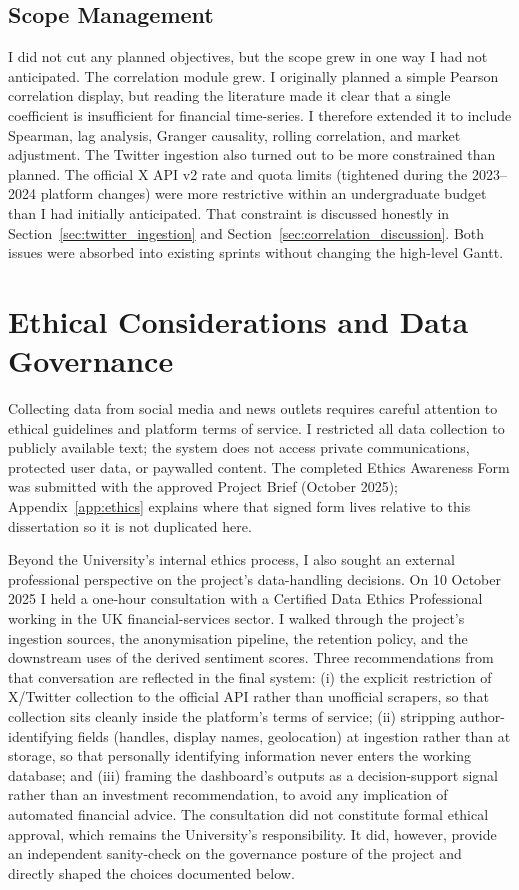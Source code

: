 \subsection{Scope Management}

I did not cut any planned objectives, but the scope grew in one way I had not anticipated. The correlation module grew. I originally planned a simple Pearson correlation display, but reading the literature made it clear that a single coefficient is insufficient for financial time-series. I therefore extended it to include Spearman, lag analysis, Granger causality, rolling correlation, and market adjustment. The Twitter ingestion also turned out to be more constrained than planned. The official X API v2 rate and quota limits (tightened during the 2023--2024 platform changes) were more restrictive within an undergraduate budget than I had initially anticipated. That constraint is discussed honestly in Section~\ref{sec:twitter_ingestion} and Section~\ref{sec:correlation_discussion}. Both issues were absorbed into existing sprints without changing the high-level Gantt.

\section{Ethical Considerations and Data Governance}
\label{sec:ethics}

Collecting data from social media and news outlets requires careful attention to ethical guidelines and platform terms of service. I restricted all data collection to publicly available text; the system does not access private communications, protected user data, or paywalled content. The completed Ethics Awareness Form was submitted with the approved Project Brief (October 2025); Appendix~\ref{app:ethics} explains where that signed form lives relative to this dissertation so it is not duplicated here.

Beyond the University's internal ethics process, I also sought an external professional perspective on the project's data-handling decisions. On 10 October 2025 I held a one-hour consultation with a Certified Data Ethics Professional working in the UK financial-services sector. I walked through the project's ingestion sources, the anonymisation pipeline, the retention policy, and the downstream uses of the derived sentiment scores. Three recommendations from that conversation are reflected in the final system: (i) the explicit restriction of X/Twitter collection to the official API rather than unofficial scrapers, so that collection sits cleanly inside the platform's terms of service; (ii) stripping author-identifying fields (handles, display names, geolocation) at ingestion rather than at storage, so that personally identifying information never enters the working database; and (iii) framing the dashboard's outputs as a decision-support signal rather than an investment recommendation, to avoid any implication of automated financial advice. The consultation did not constitute formal ethical approval, which remains the University's responsibility. It did, however, provide an independent sanity-check on the governance posture of the project and directly shaped the choices documented below.

